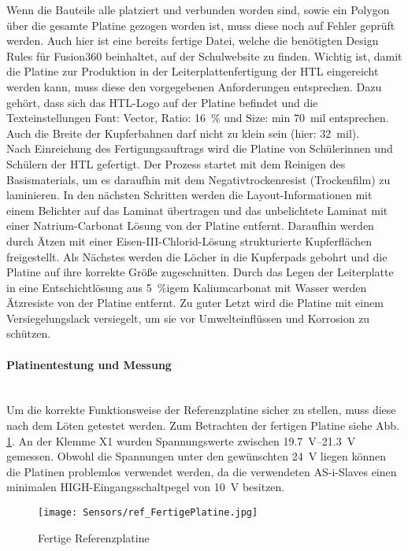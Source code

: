 Wenn die Bauteile alle platziert und verbunden worden sind, sowie ein Polygon über die gesamte Platine gezogen worden ist, muss diese noch auf Fehler geprüft werden. Auch hier ist eine bereits fertige Datei, welche die benötigten Design Rules für Fusion360 beinhaltet, auf der Schulwebsite zu finden. Wichtig ist, damit die Platine zur Produktion in der Leiterplattenfertigung der HTL eingereicht werden kann, muss diese den vorgegebenen Anforderungen entsprechen. Dazu gehört, dass sich das HTL-Logo auf der Platine befindet und die Texteinstellungen Font: Vector, Ratio: \qty{16}{\percent} und Size: min \qty{70}{mil} entsprechen. Auch die Breite der Kupferbahnen darf nicht zu klein sein (hier: \qty{32}{mil}).\\
Nach Einreichung des Fertigungsauftrags wird die Platine von Schülerinnen und Schülern der HTL gefertigt. Der Prozess startet mit dem Reinigen des Basismaterials, um es daraufhin mit dem Negativtrockenresist (Trockenfilm) zu laminieren. In den nächsten Schritten werden die Layout-Informationen mit einem Belichter auf das Laminat übertragen und das unbelichtete Laminat mit einer Natrium-Carbonat Lösung von der Platine entfernt. Daraufhin werden durch Ätzen mit einer Eisen-III-Chlorid-Lösung strukturierte Kupferflächen freigestellt. Als Nächstes werden die Löcher in die Kupferpads gebohrt und die Platine auf ihre korrekte Größe zugeschnitten. Durch das Legen der Leiterplatte in eine Entschichtlösung aus \qty{5}{\percent}{igem} Kaliumcarbonat mit Wasser werden Ätzresiste von der Platine entfernt. Zu guter Letzt wird die Platine mit einem Versiegelungslack versiegelt, um sie vor Umwelteinflüssen und Korrosion zu schützen.

\paragraph{Platinentestung und Messung} \mbox{}\\
Um die korrekte Funktionsweise der Referenzplatine sicher zu stellen, muss diese nach dem Löten getestet werden. Zum Betrachten der fertigen Platine siehe Abb. \ref{Ref_fertig}. An der Klemme X1 wurden Spannungswerte zwischen \qtyrange{19.7}{21.3}{\volt} gemessen. Obwohl die Spannungen unter den gewünschten \qty{24}{\volt} liegen können die Platinen problemlos verwendet werden, da die verwendeten AS-i-Slaves einen minimalen HIGH-Eingangsschaltpegel von \qty{10}{\volt} besitzen.\cite{AS-i-Slave}

\begin{figure}[H]
    \centering
    \texttt{[image: Sensors/ref\_FertigePlatine.jpg]}
    \caption{Fertige Referenzplatine}
    \label{Ref_fertig}
\end{figure}

